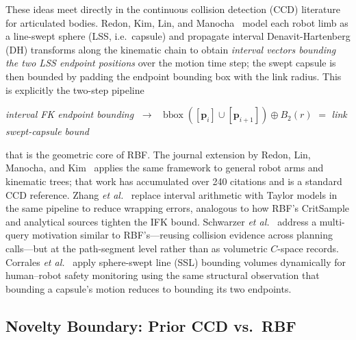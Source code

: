 \documentclass[journal]{IEEEtran}
\DeclareRobustCommand{\textsc}[1]{\textnormal{\MakeUppercase{#1}}}
\newcommand{\rbf}{\textsc{RBF}}
\newcommand{\etal}{\textit{et al.}}
\begin{document}
These ideas meet directly in the continuous collision detection (CCD) literature
for articulated bodies. Redon, Kim, Lin, and Manocha~\cite{redon2004ccd_avatar}
model each robot limb as a line-swept sphere (LSS, i.e.~capsule) and
propagate interval Denavit-Hartenberg (DH) transforms along the kinematic
chain to obtain \emph{interval vectors bounding the two LSS endpoint positions}
over the
motion time step; the swept capsule is then bounded by padding the endpoint
bounding box with the link radius. This is explicitly the two-step pipeline
%
\begin{center}
  \emph{interval FK endpoint bounding}
  $\;\longrightarrow\;$
  $\operatorname{bbox}([\mathbf{p}_i]\cup[\mathbf{p}_{i+1}]) \oplus B_2(r)$
  $=$ \emph{link swept-capsule bound}
\end{center}
%
that is the geometric core of \rbf{}.
The journal extension by Redon, Lin, Manocha, and Kim~\cite{redon2005fast_artic}
applies the same framework to general robot arms and kinematic trees; that work
has accumulated over 240 citations and is a standard CCD reference.
Zhang \etal{}~\cite{zhang2007taylor} replace interval arithmetic with Taylor
models in the same pipeline to reduce wrapping errors, analogous to how
\rbf{}'s CritSample and analytical sources tighten the IFK bound.
Schwarzer \etal{}~\cite{schwarzer2005adaptive} address a multi-query motivation
similar to \rbf{}'s---reusing collision evidence across planning calls---but at
the path-segment level rather than as volumetric $C$-space records.
Corrales \etal{}~\cite{corrales2011ssl} apply sphere-swept line (SSL) bounding
volumes dynamically for human--robot safety monitoring using the same
structural observation that
bounding a capsule's motion reduces to bounding its two endpoints.

\subsection{Novelty Boundary: Prior CCD vs.\ \rbf{}}
\label{sec:related_novelty}
\end{document}
